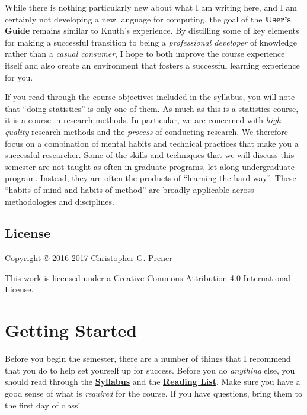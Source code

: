 \documentclass[]{book}
\theoremstyle{definition}
\theoremstyle{definition}
\theoremstyle{definition}
\theoremstyle{remark}
\begin{document}
While there is nothing particularly new about what I am writing here,
and I am certainly not developing a new language for computing, the goal
of the \textbf{User's Guide} remains similar to Knuth's experience. By
distilling some of key elements for making a successful transition to
being a \emph{professional developer} of knowledge rather than a
\emph{casual consumer}, I hope to both improve the course experience
itself and also create an environment that fosters a successful learning
experience for you.

If you read through the course objectives included in the syllabus, you
will note that ``doing statistics'' is only one of them. As much as this
is a statistics course, it is a course in research methods. In
particular, we are concerned with \emph{high quality} research methods
and the \emph{process} of conducting research. We therefore focus on a
combination of mental habits and technical practices that make you a
successful researcher. Some of the skills and techniques that we will
discuss this semester are not taught as often in graduate programs, let
along undergraduate program. Instead, they are often the products of
``learning the hard way''. These ``habits of mind and habits of method''
are broadly applicable across methodologies and disciplines.

\section*{License}\label{license}

Copyright © 2016-2017 \href{https://chris-prener.github.io}{Christopher
G. Prener}

This work is licensed under a Creative Commons Attribution 4.0
International License.

\chapter{Getting Started}\label{gettingStarted}

Before you begin the semester, there are a number of things that I
recommend that you do to help set yourself up for success. Before you do
\emph{anything} else, you should read through the
\href{https://cdn.rawgit.com/slu-soc5050/Core-Documents/bdcce556/syllabus.pdf}{\textbf{Syllabus}}
and the
\href{https://cdn.rawgit.com/slu-soc5050/Core-Documents/bdcce556/reading-list.pdf}{\textbf{Reading
List}}. Make sure you have a good sense of what is \emph{required} for
the course. If you have questions, bring them to the first day of class!
\end{document}
